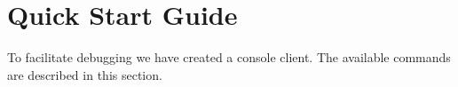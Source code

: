 \documentclass[a4paper,12pt]{article}
\begin{document}
%
%
%
%
%
%
%
%
%
%
%




\setcounter{section}{4}

\section{Quick Start Guide}
To facilitate debugging we have created a console client. The available commands are described in this section.
\end{document}
